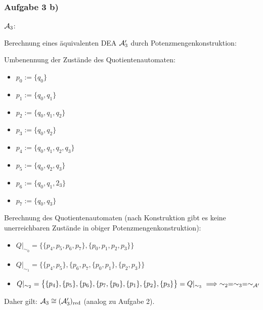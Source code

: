 \subsubsection{Aufgabe 3 b)}
$\mathcal{A}_3$:\\
\usetikzlibrary{positioning,automata}

Berechnung eines äquivalenten DEA $\mathcal{A}_3'$ durch Potenzmengenkonstruktion:

Umbenennung der Zustände des Quotientenautomaten:
\begin{itemize}
	\item $p_0:=\lbrace q_0\rbrace$
	\item $p_1:=\lbrace q_0,q_1\rbrace$
	\item $p_2:=\lbrace q_0,q_1,q_2\rbrace$
	\item $p_3:=\lbrace q_0,q_2\rbrace$
	\item $p_4:=\lbrace q_0,q_1,q_2,q_3\rbrace$
	\item $p_5:=\lbrace q_0,q_2,q_3\rbrace$
	\item $p_6:=\lbrace q_0,q_1,2_3\rbrace$
	\item $p_7:=\lbrace q_0,q_3\rbrace$
\end{itemize}

Berechnung des Quotientenautomaten (nach Konstruktion gibt es keine unerreichbaren Zustände in obiger Potenzmengenkonstruktion):
\begin{itemize}
	\item $Q|_{\sim_0}=\big\lbrace\lbrace p_4,p_5,p_6,p_7\rbrace,\lbrace p_0,p_1,p_2,p_3\rbrace\big\rbrace$
	\item $Q|_{\sim_1}=\big\lbrace\lbrace p_4,p_5\rbrace,\lbrace p_6,p_7,\lbrace p_0,p_1\rbrace,\lbrace p_2,p_3\rbrace\big\rbrace$
	\item $Q|_{\sim_2}=\big\lbrace\lbrace p_4\rbrace,\lbrace p_5\rbrace,\lbrace p_6\rbrace,\lbrace p_7,\lbrace p_0\rbrace,\lbrace p_1\rbrace,\lbrace p_2\rbrace,\lbrace p_3\rbrace\big\rbrace=Q|_{\sim_3}\implies\sim_2=\sim_3=\sim_{\mathcal{A}'}$
\end{itemize}
Daher gilt: $\mathcal{A}_3\cong(\mathcal{A}_3')_{\text{red}}$ (analog zu Aufgabe 2).

